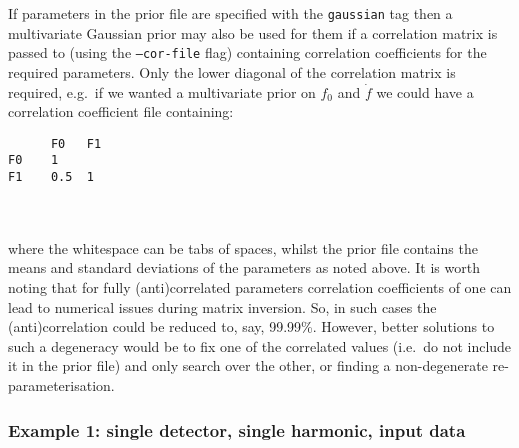 If parameters in the prior file are specified with the {\tt gaussian} tag then a multivariate Gaussian prior may also be used for them if a correlation matrix
is passed to \lppen (using the {\tt --cor-file} flag) containing correlation coefficients for the required parameters. Only the lower diagonal of the
correlation matrix is required, e.g.\ if we wanted a multivariate prior on $f_0$ and $\dot{f}$ we could have a correlation coefficient file containing:
\begin{lrbox}{\Lst}
\begin{lstlisting}
      F0   F1
F0    1
F1    0.5  1
\end{lstlisting}
\end{lrbox}
\\[5pt] \indent \fbox{\usebox{\Lst}} \\[5pt]
where the whitespace can be tabs of spaces, whilst the prior file contains the means and standard deviations of the parameters as noted above. It is worth noting
that for fully (anti)correlated parameters correlation coefficients of one can lead to numerical issues during matrix inversion. So, in such cases the
(anti)correlation could be reduced to, say, 99.99\%. However, better solutions to such a degeneracy would be to fix one of the correlated values (i.e.\ do not include
it in the prior file) and only search over the other, or finding a non-degenerate re-parameterisation.

\subsubsection{Example 1: single detector, single harmonic, input data}\label{sec:example1}

